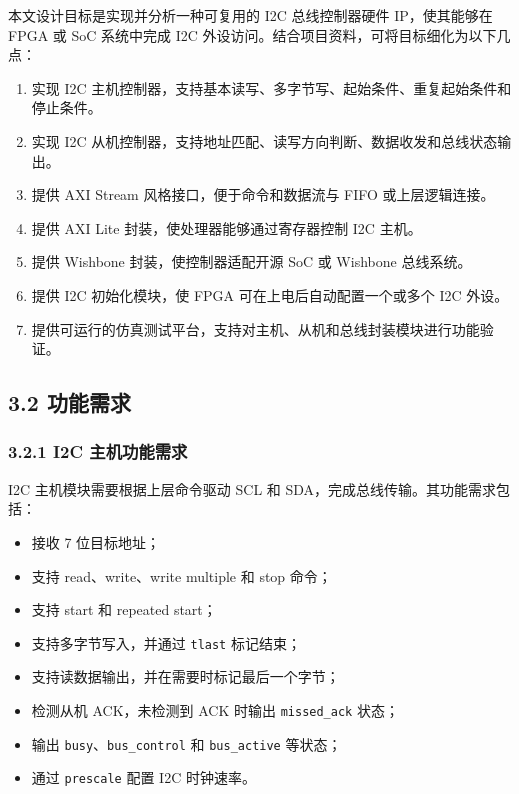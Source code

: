本文设计目标是实现并分析一种可复用的 I2C 总线控制器硬件 IP，使其能够在
FPGA 或 SoC 系统中完成 I2C
外设访问。结合项目资料，可将目标细化为以下几点：

\begin{enumerate}
\def\labelenumi{\arabic{enumi}.}
\tightlist
\item
  实现 I2C
  主机控制器，支持基本读写、多字节写、起始条件、重复起始条件和停止条件。
\item
  实现 I2C
  从机控制器，支持地址匹配、读写方向判断、数据收发和总线状态输出。
\item
  提供 AXI Stream 风格接口，便于命令和数据流与 FIFO 或上层逻辑连接。
\item
  提供 AXI Lite 封装，使处理器能够通过寄存器控制 I2C 主机。
\item
  提供 Wishbone 封装，使控制器适配开源 SoC 或 Wishbone 总线系统。
\item
  提供 I2C 初始化模块，使 FPGA 可在上电后自动配置一个或多个 I2C 外设。
\item
  提供可运行的仿真测试平台，支持对主机、从机和总线封装模块进行功能验证。
\end{enumerate}

\subsection{3.2 功能需求}\label{ux529fux80fdux9700ux6c42}

\subsubsection{3.2.1 I2C
主机功能需求}\label{i2c-ux4e3bux673aux529fux80fdux9700ux6c42}

I2C 主机模块需要根据上层命令驱动 SCL 和
SDA，完成总线传输。其功能需求包括：

\begin{itemize}
\tightlist
\item
  接收 7 位目标地址；
\item
  支持 read、write、write multiple 和 stop 命令；
\item
  支持 start 和 repeated start；
\item
  支持多字节写入，并通过 \texttt{tlast} 标记结束；
\item
  支持读数据输出，并在需要时标记最后一个字节；
\item
  检测从机 ACK，未检测到 ACK 时输出 \texttt{missed\_ack} 状态；
\item
  输出 \texttt{busy}、\texttt{bus\_control} 和 \texttt{bus\_active}
  等状态；
\item
  通过 \texttt{prescale} 配置 I2C 时钟速率。
\end{itemize}

